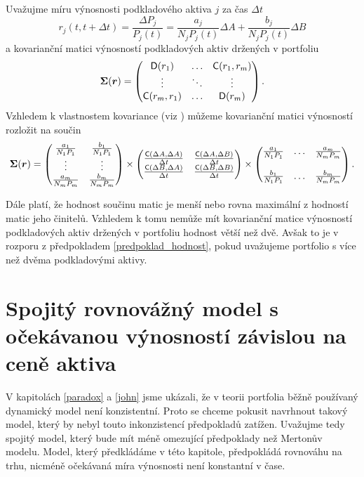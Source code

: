 \documentclass[a4paper,12pt]{report}
\theoremstyle{definition} \newtheorem{definice}[veta]{Definice}
\theoremstyle{remark}
\begin{document}
Uvažujme míru výnosnosti podkladového aktiva $j$ za čas $\Delta t$
\begin{displaymath}
r_j(t,t+\Delta t)=\frac{\Delta P_j}{P_j(t)}=\frac{a_j}{N_jP_j(t)}\Delta A + \frac{b_j}{N_jP_j(t)}\Delta B
\end{displaymath}
a kovarianční matici výnosností podkladových aktiv držených v portfoliu
$$\boldsymbol{\Sigma}(\boldsymbol{r})=
\begin{pmatrix}
\mathsf{D}(r_1)  & \ldots & \mathsf{C}(r_1,r_m)  \cr \vdots & \ddots & \vdots\cr \mathsf{C}(r_m,r_1)   & \ldots & \mathsf{D}(r_m) 
\end{pmatrix}.$$
Vzhledem k vlastnostem kovariance (viz \cite{andel}) můžeme kovarianční matici výnosností rozložit na součin 
$$
\boldsymbol{\Sigma}(\boldsymbol{r})= 
\begin{pmatrix}
\frac{a_1}{N_1P_1} & \frac{b_1}{N_1P_1}\cr \vdots & \vdots\cr \frac{a_m}{N_mP_m} & \frac{b_m}{N_mP_m}
\end{pmatrix}
\times
\begin{pmatrix}
\frac{\mathsf{C}(\Delta A, \Delta A)}{\Delta t} &
\frac{\mathsf{C}(\Delta A, \Delta B)}{\Delta t} \cr
\frac{\mathsf{C}(\Delta B, \Delta A)}{\Delta t} & \frac{\mathsf{C}(\Delta B,
\Delta B)}{\Delta t} 
\end{pmatrix}
\times
\begin{pmatrix}
\frac{a_1}{N_1P_1} & \ldots & \frac{a_m}{N_mP_m}\cr \cr \frac{b_1}{N_1P_1} & \ldots &
\frac{b_m}{N_mP_m}
\end{pmatrix}.
$$

Dále platí, že hodnost součinu matic je menší nebo rovna maximální z hodností matic jeho činitelů.
Vzhledem k tomu nemůže mít kovarianční matice výnosností podkladových aktiv držených v portfoliu hodnost větší než dvě.
Avšak to je v rozporu z předpokladem \ref{predpoklad_hodnost}, pokud uvažujeme portfolio s více než dvěma podkladovými aktivy.


\section{Spojitý rovnovážný model s očekávanou výnosností závislou na ceně aktiva }
V kapitolách \ref{paradox} a \ref{john} jsme ukázali, že v teorii portfolia běžně používaný dynamický model není konzistentní.
Proto se chceme pokusit navrhnout takový model, který by nebyl touto inkonzistencí předpokladů zatížen.
Uvažujme tedy spojitý model, který bude mít méně omezující předpoklady než Mertonův modelu.
Model, který předkládáme v této kapitole, předpokládá rovnováhu na trhu, nicméně očekávaná míra výnosnosti není konstantní v čase.
\end{document}
